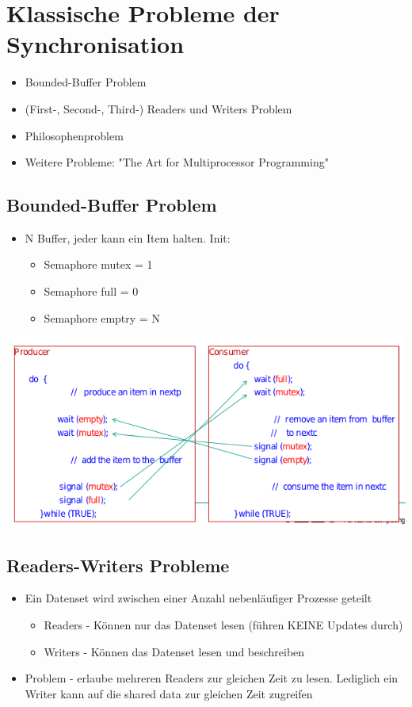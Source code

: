 \documentclass[a4paper]{scrreprt}
\begin{document}
\section{Klassische Probleme der Synchronisation}
		\begin{itemize}
			\item Bounded-Buffer Problem
			\item (First-, Second-, Third-) Readers und Writers Problem
			\item Philosophenproblem
			\item Weitere Probleme: "The Art for Multiprocessor Programming"
		\end{itemize}
		
	\subsection{Bounded-Buffer Problem}
		\begin{itemize}
			\item N Buffer, jeder kann ein Item halten. Init:
				\begin{itemize}
					\item Semaphore mutex = 1
					\item Semaphore full = 0
					\item Semaphore emptry = N
				\end{itemize}
		\end{itemize}
	\includegraphics[scale=0.75]{graphics/boundedbufferprob.png}
	
	\subsection{Readers-Writers Probleme}
		\begin{itemize}
			\item Ein Datenset wird zwischen einer Anzahl nebenläufiger Prozesse geteilt
			\begin{itemize}
				\item Readers - Können nur das Datenset lesen (führen KEINE Updates durch)
				\item Writers - Können das Datenset lesen und beschreiben
			\end{itemize}
			\item Problem - erlaube mehreren Readers zur gleichen Zeit zu lesen. Lediglich ein Writer kann auf die shared data zur gleichen Zeit zugreifen
		\end{itemize}
			
\end{document}
